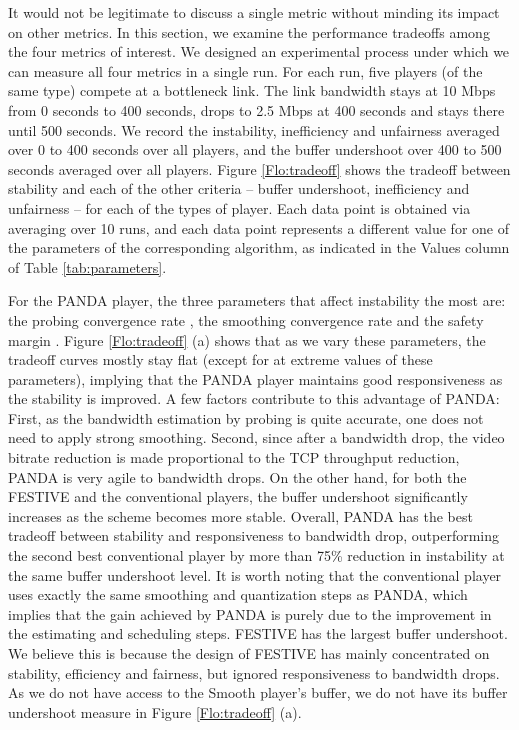 \documentclass[conference]{IEEEtran}
\theoremstyle{plain}
\theoremstyle{definition}
\theoremstyle{plain}
\theoremstyle{plain}
\begin{document}
It would not be legitimate to discuss a single metric without minding
its impact on other metrics. In this section, we examine the performance
tradeoffs among the four metrics of interest. We designed an experimental
process under which we can measure all four metrics in a single run.
For each run, five players (of the same type) compete at a bottleneck
link. The link bandwidth stays at 10 Mbps from 0 seconds to 400 seconds,
drops to 2.5 Mbps at 400 seconds and stays there until 500 seconds.
We record the instability, inefficiency and unfairness averaged over
0 to 400 seconds over all players, and the buffer undershoot over
400 to 500 seconds averaged over all players. Figure \ref{Flo:tradeoff}
shows the tradeoff between stability and each of the other criteria
-- buffer undershoot, inefficiency and unfairness -- for each of the
types of player. Each data point is obtained via averaging over 10
runs, and each data point represents a different value for one of
the parameters of the corresponding algorithm, as indicated in the
Values column of Table \ref{tab:parameters}.

For the PANDA player, the three parameters that affect instability
the most are: the probing convergence rate , the smoothing
convergence rate  and the safety margin . Figure
\ref{Flo:tradeoff} (a) shows that as we vary these parameters, the
tradeoff curves mostly stay flat (except for at extreme values of
these parameters), implying that the PANDA player maintains good responsiveness
as the stability is improved. A few factors contribute to this advantage
of PANDA: First, as the bandwidth estimation by probing is quite accurate,
one does not need to apply strong smoothing. Second, since after a
bandwidth drop, the video bitrate reduction is made proportional to
the TCP throughput reduction, PANDA is very agile to bandwidth drops.
On the other hand, for both the FESTIVE and the conventional players,
the buffer undershoot significantly increases as the scheme becomes
more stable. Overall, PANDA has the best tradeoff between stability
and responsiveness to bandwidth drop, outperforming the second best
conventional player by more than 75\% reduction in instability at
the same buffer undershoot level. It is worth noting that the conventional
player uses exactly the same smoothing and quantization steps as PANDA,
which implies that the gain achieved by PANDA is purely due to the
improvement in the estimating and scheduling steps. FESTIVE has the
largest buffer undershoot. We believe this is because the design of
FESTIVE has mainly concentrated on stability, efficiency and fairness,
but ignored responsiveness to bandwidth drops. As we do not have access
to the Smooth player's buffer, we do not have its buffer undershoot
measure in Figure \ref{Flo:tradeoff} (a).
\end{document}
